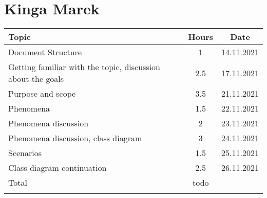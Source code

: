 \section*{Kinga Marek}
\begin{table}[H]
    \centering
    \begin{tabular}{lcc} \Xhline{1.5pt}
        Topic &  Hours & Date \\ \hline
        Document Structure & 1 & 14.11.2021 \\ 
        Getting familiar with the topic, discussion about the goals & 2.5 & 17.11.2021 \\ 
        Purpose and scope & 3.5 & 21.11.2021 \\
        Phenomena & 1.5 & 22.11.2021 \\ 
        Phenomena discussion & 2 & 23.11.2021 \\
        Phenomena discussion, class diagram & 3 & 24.11.2021 \\ 
        Scenarios & 1.5 & 25.11.2021 \\ 
        Class diagram continuation & 2.5 & 26.11.2021 \\ \hline
        Total & todo & \\ \Xhline{1.5pt}
    \end{tabular}
\end{table}